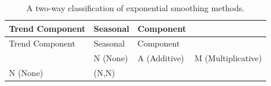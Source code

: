 \documentclass[]{book}
\begin{document}
\begin{longtable}[]{@{}llll@{}}
\caption{\label{tab:taxonomy} A two-way classification of exponential smoothing methods.}\tabularnewline
\toprule
\begin{minipage}[b]{0.32\columnwidth}\raggedright
Trend Component\strut
\end{minipage} & \begin{minipage}[b]{0.19\columnwidth}\raggedright
Seasonal\strut
\end{minipage} & \begin{minipage}[b]{0.19\columnwidth}\raggedright
Component\strut
\end{minipage} & \begin{minipage}[b]{0.20\columnwidth}\raggedright
\strut
\end{minipage}\tabularnewline
\midrule
\endfirsthead
\toprule
\begin{minipage}[b]{0.32\columnwidth}\raggedright
Trend Component\strut
\end{minipage} & \begin{minipage}[b]{0.19\columnwidth}\raggedright
Seasonal\strut
\end{minipage} & \begin{minipage}[b]{0.19\columnwidth}\raggedright
Component\strut
\end{minipage} & \begin{minipage}[b]{0.20\columnwidth}\raggedright
\strut
\end{minipage}\tabularnewline
\midrule
\endhead
\begin{minipage}[t]{0.32\columnwidth}\raggedright
\strut
\end{minipage} & \begin{minipage}[t]{0.19\columnwidth}\raggedright
N (None)\strut
\end{minipage} & \begin{minipage}[t]{0.19\columnwidth}\raggedright
A (Additive)\strut
\end{minipage} & \begin{minipage}[t]{0.20\columnwidth}\raggedright
M (Multiplicative)\strut
\end{minipage}\tabularnewline
\begin{minipage}[t]{0.32\columnwidth}\raggedright
N (None)\strut
\end{minipage} & \begin{minipage}[t]{0.19\columnwidth}\raggedright
(N,N)\strut
\end{minipage} & \begin{minipage}[t]{0.19\columnwidth}\raggedright

\end{minipage}
\end{longtable}
\end{document}
